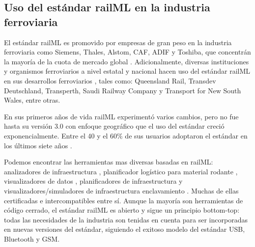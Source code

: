 \subsection{Uso del estándar railML en la industria ferroviaria}

    El estándar railML es promovido por empresas de gran peso en la industria ferroviaria como Siemens, Thales, Alstom, CAF, ADIF y Toshiba, que concentrán la mayoría de la cuota de mercado global \cite{PARTNERS}. Adicionalmente, diversas instituciones y organismos ferroviarios a nivel estatal y nacional hacen uso del estándar railML en sus desarrollos ferroviarios \cite{PARTNERS}, tales como: Queensland Rail, Transdev Deutschland, Transperth, Saudi Railway Company y Transport for New South Wales, entre otras.

    En sus primeros años de vida railML experimentó varios cambios, pero no fue hasta su versión 3.0 con enfoque geográfico que el uso del estándar creció exponencialmente. Entre el 40 y el 60\% de sus usuarios adoptaron el estándar en los últimos siete años \cite{PARTNERS}.

    Podemos encontrar las herramientas mas diversas basadas en railML: analizadores de infraestructura \cite{MAPREX}, planificador logístico para material rodante \cite{IVU}, visualizadores de datos \cite{RAILVIVID}, planificadores de infraestructura \cite{VISALL3D} y visualizadores/simuladores de infraestructura enclavamiento \cite{DESIGN4RAIL}. Muchas de ellas certificadas e intercompatibles entre sí. Aunque la mayoría son herramientas de código cerrado, el estándar railML es abierto y sigue un principio bottom-top: todas las necesidades de la industria son tenidas en cuenta para ser incorporadas en nuevas versiones del estándar, siguiendo el exitoso modelo del estándar USB, Bluetooth y GSM. 